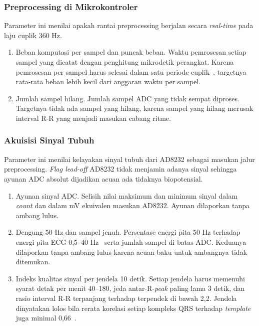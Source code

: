 \subsubsection{Preprocessing di Mikrokontroler}

Parameter ini menilai apakah rantai preprocessing berjalan secara \textit{real-time} pada laju cuplik 360 Hz.
\begin{enumerate}[label=\arabic*)]
  \item Beban komputasi per sampel dan puncak beban. Waktu pemrosesan setiap sampel yang dicatat dengan penghitung mikrodetik perangkat. Karena pemrosesan per sampel harus selesai dalam satu periode cuplik~\cite{busia_2025}, targetnya rata-rata beban lebih kecil dari anggaran waktu per sampel.
  \item Jumlah sampel hilang. Jumlah sampel ADC yang tidak sempat diproses. Targetnya tidak ada sampel yang hilang, karena sampel yang hilang merusak interval R-R yang menjadi masukan cabang ritme.
\end{enumerate}

\subsubsection{Akuisisi Sinyal Tubuh}

Parameter ini menilai kelayakan sinyal tubuh dari AD8232 sebagai masukan jalur preprocessing. \textit{Flag lead-off} AD8232 tidak menjamin adanya sinyal sehingga ayunan ADC absolut dijadikan acuan ada tidaknya biopotensial.
\begin{enumerate}[label=\arabic*)]
  \item Ayunan sinyal ADC. Selisih nilai maksimum dan minimum sinyal dalam \textit{count} dan dalam mV ekuivalen masukan AD8232. Ayunan dilaporkan tanpa ambang lulus.
  \item Dengung 50 Hz dan sampel jenuh. Persentase energi pita 50 Hz terhadap energi pita ECG 0,5--40 Hz~\cite{gajdzik_2026} serta jumlah sampel di batas ADC. Keduanya dilaporkan tanpa ambang lulus karena acuan baku untuk ambangnya tidak ditemukan.
  \item Indeks kualitas sinyal per jendela 10 detik. Setiap jendela harus memenuhi syarat detak per menit 40--180, jeda antar-R-\textit{peak} paling lama 3 detik, dan rasio interval R-R terpanjang terhadap terpendek di bawah 2,2. Jendela dinyatakan lolos bila rerata korelasi setiap kompleks QRS terhadap \textit{template} juga minimal 0,66~\cite{syversen_2024}.
\end{enumerate}

